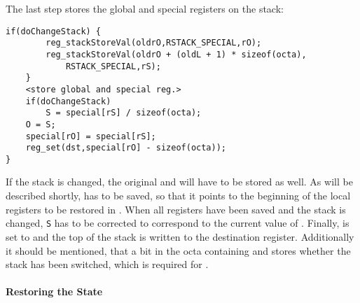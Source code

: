 The last step stores the global and special registers on the stack:
\begin{lstlisting}[language=GIMMIXC,caption={Implementation of {\tt reg\_save}, part 3 (partially pseudo-code)}]
	if(doChangeStack) {
		reg_stackStoreVal(oldrO,RSTACK_SPECIAL,rO);
		reg_stackStoreVal(oldrO + (oldL + 1) * sizeof(octa),
			RSTACK_SPECIAL,rS);
	}
	<store global and special reg.>
	if(doChangeStack)
		S = special[rS] / sizeof(octa);
	O = S;
	special[rO] = special[rS];
	reg_set(dst,special[rO] - sizeof(octa));
}
\end{lstlisting}
If the stack is changed, the original  and  will have to be stored as well. As will be described shortly,  has to be saved, so that it points to the beginning of the local registers to be restored in . When all registers have been saved and the stack is changed, {\tt S} has to be corrected to correspond to the current value of . Finally,  is set to  and the top of the stack is written to the destination register. Additionally it should be mentioned, that a bit in the octa containing  and  stores whether the stack has been switched, which is required for .

\paragraph{Restoring the State}

